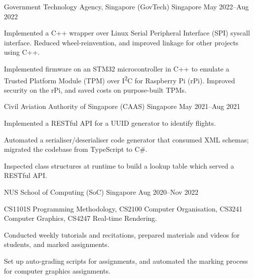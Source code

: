 \begin{cventries}
	{Government Technology Agency, Singapore (GovTech)} %
	{Singapore} %
	{May 2022--Aug 2022} %
	{
		\begin{cvitems} %
			\item Implemented a C++ wrapper over Linux Serial Peripheral Interface (SPI) syscall interface. Reduced wheel-reinvention, and improved linkage for other projects using C++.
			\item Implemented firmware on an STM32 microcontroller in C++ to emulate a Trusted Platform Module (TPM) over I\textsuperscript{2}C for Raspberry Pi (rPi). Improved security on the rPi, and saved costs on purpose-built TPMs.
		\end{cvitems}
	}


	{Civil Aviation Authority of Singapore (CAAS)} %
	{Singapore} %
	{May 2021--Aug 2021} %
	{
		\begin{cvitems} %
			\item Implemented a RESTful API for a UUID generator to identify flights.
			\item Automated a serialiser/deserialiser code generator that consumed XML schemas; migrated the codebase from TypeScript to C\#.
			\item Inspected class structures at runtime to build a lookup table which served a RESTful API.
		\end{cvitems}
	}


	{NUS School of Computing (SoC)} %
	{Singapore} %
	{Aug 2020--Nov 2022} %
	{
		\begin{cvitems} %
			\item CS1101S Programming Methodology, CS2100 Computer Organisation, CS3241 Computer Graphics, CS4247 Real-time Rendering.
			\item Conducted weekly tutorials and recitations, prepared materials and videos for students, and marked assignments.
			\item Set up auto-grading scripts for assignments, and automated the marking process for computer graphics assignments.
		\end{cvitems}
	}


\end{cventries}
